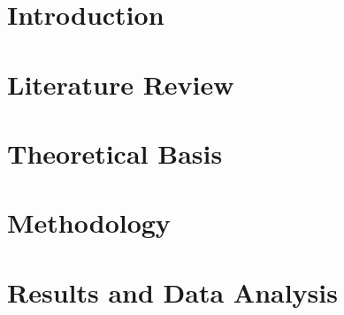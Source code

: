\documentclass[12pt,a4paper,2sides]{report}
\begin{document}
	


\newpage

\newpage
{}
\setcounter{page}{1}


\newpage
\clearpage
\dominitoc
\tableofcontents %
\listoftables
\listoffigures
\newpage
\clearpage

\clearpage
{}
\setcounter{page}{1}
\clearpage
%

\chapter{Introduction}


\chapter{Literature Review}



\chapter{Theoretical Basis}


\chapter{Methodology}



\chapter{Results and Data Analysis}




\end{document}
